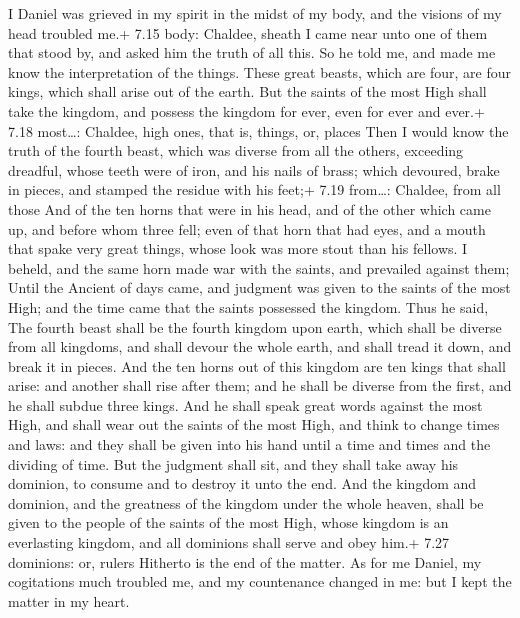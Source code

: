  I Daniel was grieved in my spirit in the midst of my
body, and the visions of my head troubled me.+ 7.15 body: Chaldee,
sheath  I came near unto one of them that stood by, and
asked him the truth of all this. So he told me, and made me know the
interpretation of the things.  These great beasts, which
are four, are four kings, which shall arise out of the earth.
 But the saints of the most High shall take the kingdom,
and possess the kingdom for ever, even for ever and ever.+ 7.18
most\ldots: Chaldee, high ones, that is, things, or, places
 Then I would know the truth of the fourth beast, which was
diverse from all the others, exceeding dreadful, whose teeth were of
iron, and his nails of brass; which devoured, brake in pieces, and
stamped the residue with his feet;+ 7.19 from\ldots: Chaldee, from all
those  And of the ten horns that were in his head, and of
the other which came up, and before whom three fell; even of that horn
that had eyes, and a mouth that spake very great things, whose look was
more stout than his fellows.  I beheld, and the same horn
made war with the saints, and prevailed against them; 
Until the Ancient of days came, and judgment was given to the saints of
the most High; and the time came that the saints possessed the kingdom.
 Thus he said, The fourth beast shall be the fourth kingdom
upon earth, which shall be diverse from all kingdoms, and shall devour
the whole earth, and shall tread it down, and break it in pieces.
 And the ten horns out of this kingdom are ten kings that
shall arise: and another shall rise after them; and he shall be diverse
from the first, and he shall subdue three kings.  And he
shall speak great words against the most High, and shall wear out the
saints of the most High, and think to change times and laws: and they
shall be given into his hand until a time and times and the dividing of
time.  But the judgment shall sit, and they shall take away
his dominion, to consume and to destroy it unto the end. 
And the kingdom and dominion, and the greatness of the kingdom under the
whole heaven, shall be given to the people of the saints of the most
High, whose kingdom is an everlasting kingdom, and all dominions shall
serve and obey him.+ 7.27 dominions: or, rulers  Hitherto
is the end of the matter. As for me Daniel, my cogitations much troubled
me, and my countenance changed in me: but I kept the matter in my heart.

